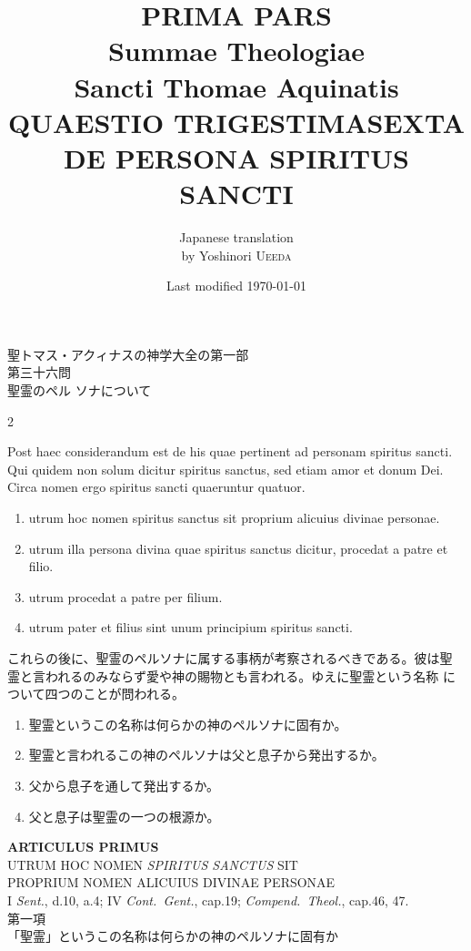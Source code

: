 \documentclass[paper=a4paper,fontsize=10pt,jafontsize=9pt,titlepage]{jlreq}
\title{{\bfseries PRIMA PARS}\\{\Huge Summae Theologiae}\\Sancti Thomae
Aquinatis\\{\sffamily QUAESTIO TRIGESTIMASEXTA}\\DE PERSONA SPIRITUS SANCTI}
\author{Japanese translation\\by Yoshinori {\scshape Ueeda}}
\date{Last modified \today}
\begin{document}
\maketitle

\begin{center}
{\Large 聖トマス・アクィナスの神学大全の第一部\\第三十六問\\聖霊のペル
 ソナについて}
\end{center}

\thispagestyle{empty}
\begin{paracol}{2}

{\Huge P}ost haec considerandum est de his quae pertinent ad personam
 spiritus sancti. Qui quidem non solum dicitur spiritus sanctus, sed
 etiam amor et donum Dei. Circa nomen ergo spiritus sancti quaeruntur
 quatuor. 

\begin{enumerate}
 \item utrum hoc nomen spiritus sanctus sit proprium alicuius divinae personae.
 \item utrum illa persona divina quae spiritus sanctus dicitur, procedat a patre et filio.
 \item utrum procedat a patre per filium.
 \item utrum pater et filius sint unum principium spiritus sancti.
\end{enumerate}

\switchcolumn

これらの後に、聖霊のペルソナに属する事柄が考察されるべきである。彼は聖
 霊と言われるのみならず愛や神の賜物とも言われる。ゆえに聖霊という名称
 について四つのことが問われる。


\begin{enumerate}
 \item 聖霊というこの名称は何らかの神のペルソナに固有か。
 \item 聖霊と言われるこの神のペルソナは父と息子から発出するか。
 \item 父から息子を通して発出するか。
 \item 父と息子は聖霊の一つの根源か。
\end{enumerate}

\end{paracol}



\newpage





\begin{center}
{\Large {\bfseries ARTICULUS PRIMUS}}\\
{\large UTRUM HOC NOMEN {\itshape SPIRITUS SANCTUS} SIT \\PROPRIUM
 NOMEN ALICUIUS DIVINAE PERSONAE}\\
{\footnotesize I {\itshape Sent.}, d.10, a.4; IV {\itshape
 Cont.~Gent.}, cap.19; {\itshape Compend.~Theol.}, cap.46, 47. }\\
{\Large 第一項\\「聖霊」というこの名称は何らかの神のペルソナに固有か}
\end{center}
\end{document}
